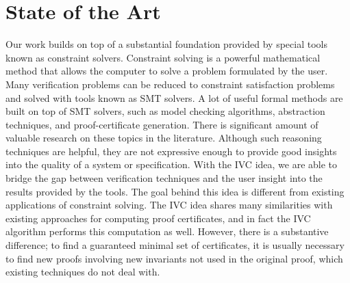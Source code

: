\section{State of the Art}
Our work builds on top of a substantial foundation provided by special tools known as constraint solvers. Constraint solving is a powerful mathematical method that allows the computer to solve a problem formulated by the user. Many verification problems can be reduced to constraint satisfaction problems and solved with tools known as SMT  solvers.  A lot of useful formal methods are built on top of SMT solvers, such as model checking algorithms, abstraction techniques, and proof-certificate generation. There is significant amount of valuable research on these topics in the literature. Although such reasoning techniques are helpful, they are not expressive enough to provide good insights into the quality of a system or specification. With the IVC idea, we are able to bridge the gap between verification techniques and the user insight into the results provided by the tools. The goal behind this idea is different from existing applications of constraint solving. The IVC idea shares many similarities with existing approaches for computing proof certificates, and in fact the IVC algorithm performs this computation as well. However, there is a substantive difference; to find a guaranteed minimal set of certificates, it is usually necessary to find new proofs involving new invariants not used in the original proof, which existing techniques do not deal with.
 

 
